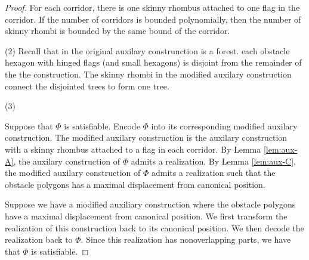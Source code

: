 \begin{proof}
For each corridor, there is one skinny rhombus attached to one flag in the corridor.  If the number of corridors is bounded polynomially, then the number of skinny rhombi is bounded by the same bound of the corridor.

\noindent (2) Recall that in the original auxilary construnction is a forest.
each obstacle hexagon with hinged flags (and small hexagons) is disjoint from the remainder of the the construction. 
The skinny rhombi in the modified auxilary construction connect the disjointed trees to form one tree.

\noindent (3) 








Suppose that $\Phi$ is satisfiable.  
Encode $\Phi$ into its corresponding modified auxilary construction.
The modified auxilary construction is the auxilary construction with a skinny rhombus attached to a flag in each corridor.   
By Lemma \ref{lem:aux-A}, the auxilary construction of $\Phi$ admits a realization.
By Lemma \ref{lem:aux-C}, the modified auxilary construction of $\Phi$ admits a realization such that the obstacle polygons has a maximal displacement from canonical position.

Suppose we have a modified auxiliary construction where the obstacle polygons have a maximal displacement from canonical position.
We first transform the realization of this construction back to its canonical position.
We then decode the realization back to $\Phi$.  
Since this realization has nonoverlapping parts, we have that $\Phi$ is satisfiable.




\end{proof}
